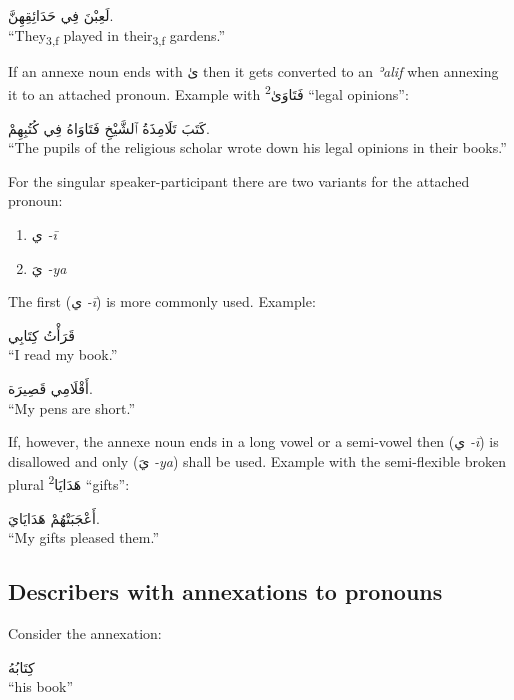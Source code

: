 \documentclass[
  10pt,
]{book}
\providecommand{\tightlist}{%
  \setlength{\itemsep}{0pt}\setlength{\parskip}{0pt}}
\begin{document}
\foreignlanguage{arabic}{لَعِبْنَ فِي حَدَائِقِهِنَّ.}\\
\enquote{They\textsubscript{3,f} played in their\textsubscript{3,f} gardens.}

If an annexe noun ends with \foreignlanguage{arabic}{ىٰ} then it gets converted to an \emph{ʾalif} when annexing it to an attached pronoun. Example with \foreignlanguage{arabic}{فَتَاوَىٰ\textsuperscript{2}} \enquote{legal opinions}:

\foreignlanguage{arabic}{کَتَبَ تَلَامِذَةُ ٱلشَّيْخِ فَتَاوَاهُ فِي کُتُبِهِمْ.}\\
\enquote{The pupils of the religious scholar wrote down his legal opinions in their books.}

For the singular speaker-participant there are two variants for the attached pronoun:

\begin{enumerate}
\def\labelenumi{\roman{enumi}.}
\tightlist
\item
  \foreignlanguage{arabic}{ي} \emph{-ī}
\item
  \foreignlanguage{arabic}{يَ} \emph{-ya}
\end{enumerate}

The first (\foreignlanguage{arabic}{ي} \emph{-ī}) is more commonly used. Example:

\foreignlanguage{arabic}{قَرَأْتُ کِتَابِي}\\
\enquote{I read my book.}

\foreignlanguage{arabic}{أَقْلَامِي قَصِيرَة.}\\
\enquote{My pens are short.}

If, however, the annexe noun ends in a long vowel or a semi-vowel then
(\foreignlanguage{arabic}{ي} \emph{-ī}) is disallowed and only
(\foreignlanguage{arabic}{يَ} \emph{-ya}) shall be used.
Example with the semi-flexible broken plural \foreignlanguage{arabic}{هَدَايَا\textsuperscript{2}} \enquote{gifts}:

\foreignlanguage{arabic}{أَعْجَبَتْهُمْ هَدَايَايَ.}\\
\enquote{My gifts pleased them.}

\subsection{Describers with annexations to pronouns}\label{describers-with-annexations-to-pronouns}

Consider the annexation:

\foreignlanguage{arabic}{کِتَابُهُ}\\
\enquote{his book}
\end{document}
